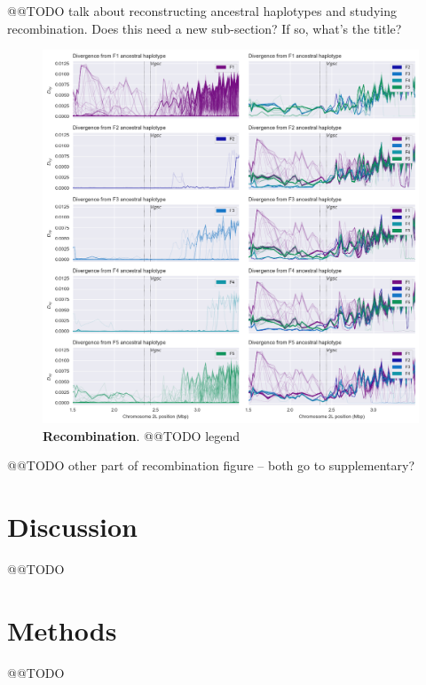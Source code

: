 \documentclass[a4paper,11pt,abstracton]{scrartcl}
\begin{document}
@@TODO talk about reconstructing ancestral haplotypes and studying recombination. Does this need a new sub-section? If so, what's the title?


\begin{figure}[!b]
  \includegraphics[width=1.1\linewidth,center]{artwork/fig_recom.png}
  \caption{\textbf{Recombination}. @@TODO legend}
  \label{fig:map}
\end{figure}


@@TODO other part of recombination figure -- both go to supplementary?


\section*{Discussion}

@@TODO


\section*{Methods}

@@TODO

\printbibliography
\end{document}

